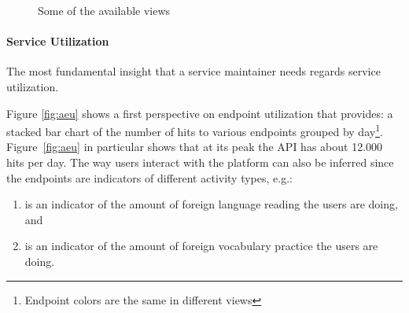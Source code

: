 \documentclass{sig-alternate-05-2015}
\begin{document}
\begin{figure}[t]
	\caption{Some of the available views\label{fig:views}}
\end{figure}

     



\paragraph{Service Utilization}
\label{sec:util}

The most fundamental insight that a service maintainer needs regards service utilization. %

Figure \ref{fig:aeu} shows a first perspective on endpoint utilization that \tool provides: a stacked bar chart of the number of hits to various endpoints grouped by day\footnote{Endpoint colors are the same in different views}. Figure~\ref{fig:aeu} in particular shows that at its peak the API has about 12.000 hits per day. 
The way users interact with the platform can also be inferred since the endpoints are indicators of different activity types, e.g.: 

\begin{enumerate}
	
	\item {\color{myred} \epTranslations} is an indicator of the amount of foreign language reading the users are doing, and 
	
	\item {\color{mygreen} \epOutcome} is an indicator of the amount of foreign vocabulary practice the users are doing.
	
\end{enumerate}
\end{document}
